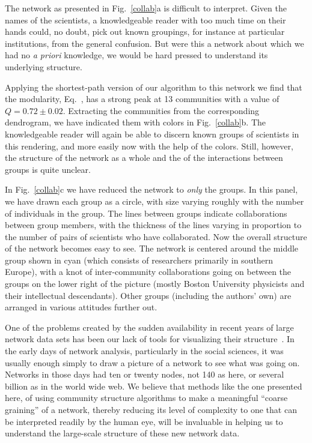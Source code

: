 \documentclass[twocolumn,pre,superscriptaddress]{revtex4}
\begin{document}
The network as presented in Fig.~\ref{collab}a is difficult to interpret.
Given the names of the scientists, a knowledgeable reader with too much
time on their hands could, no doubt, pick out known groupings, for instance
at particular institutions, from the general confusion.  But were this a
network about which we had no \textit{a priori} knowledge, we would be hard
pressed to understand its underlying structure.

Applying the shortest-path version of our algorithm to this network we find
that the modularity, Eq.~, has a strong peak at 13 communities
with a value of $Q=0.72\pm0.02$.  Extracting the communities from the
corresponding dendrogram, we have indicated them with colors in
Fig.~\ref{collab}b.  The knowledgeable reader will again be able to discern
known groups of scientists in this rendering, and more easily now with the
help of the colors.  Still, however, the structure of the network as a
whole and the of the interactions between groups is quite unclear.

In Fig.~\ref{collab}c we have reduced the network to \emph{only} the
groups.  In this panel, we have drawn each group as a circle, with size
varying roughly with the number of individuals in the group.  The lines
between groups indicate collaborations between group members, with the
thickness of the lines varying in proportion to the number of pairs of
scientists who have collaborated.  Now the overall structure of the network
becomes easy to see.  The network is centered around the middle group shown
in cyan (which consists of researchers primarily in southern Europe), with
a knot of inter-community collaborations going on between the groups on the
lower right of the picture (mostly Boston University physicists and their
intellectual descendants).  Other groups (including the authors' own) are
arranged in various attitudes further out.

One of the problems created by the sudden availability in recent years of
large network data sets has been our lack of tools for visualizing their
structure~\cite{Newman03d}.  In the early days of network analysis,
particularly in the social sciences, it was usually enough simply to draw a
picture of a network to see what was going on.  Networks in those days had
ten or twenty nodes, not 140 as here, or several billion as in the world
wide web.  We believe that methods like the one presented here, of using
community structure algorithms to make a meaningful ``coarse graining'' of
a network, thereby reducing its level of complexity to one that can be
interpreted readily by the human eye, will be invaluable in helping us to
understand the large-scale structure of these new network data.
\end{document}
